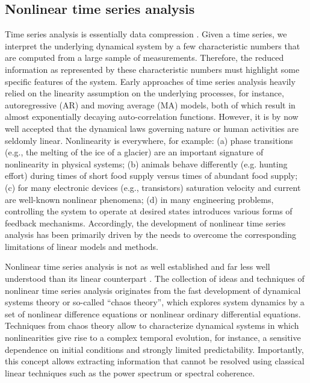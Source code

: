 	\subsection{Nonlinear time series analysis}
	Time series analysis is essentially data compression \cite{Bradley2015c}. Given a time series, we interpret the underlying dynamical system by a few characteristic numbers that are computed from a large sample of measurements. Therefore, the reduced information as represented by these characteristic numbers must highlight some specific features of the system. Early approaches of time series analysis heavily relied on the linearity assumption on the underlying processes, for instance, autoregressive (AR) and moving average (MA) models, both of which result in almost exponentially decaying auto-correlation functions. However, it is by now well accepted that the dynamical laws governing nature or human activities are seldomly linear. Nonlinearity is everywhere, for example: (a) phase transitions (e.g., the melting of the ice of a glacier) are an important signature of nonlinearity in physical systems; (b) animals behave differently (e.g. hunting effort) during times of short food supply versus times of abundant food supply; (c) for many electronic devices (e.g., transistors) saturation velocity and current are well-known nonlinear phenomena; (d) in many engineering problems, controlling the system to operate at desired states introduces various forms of feedback mechanisms. Accordingly, the development of nonlinear time series analysis has been primarily driven by the needs to overcome the corresponding limitations of linear models and methods. 

	Nonlinear time series analysis is not as well established and far less well understood than its linear counterpart \cite{kantz1997}. The collection of ideas and techniques of nonlinear time series analysis originates from the fast development of dynamical systems theory or so-called ``chaos theory'', which explores system dynamics by a set of nonlinear difference equations or nonlinear ordinary differential equations. Techniques from chaos theory allow to characterize dynamical systems in which nonlinearities give rise to a complex temporal evolution, for instance, a sensitive dependence on initial conditions and strongly limited predictability. Importantly, this concept allows extracting information that cannot be resolved using classical linear techniques such as the power spectrum or spectral coherence.

